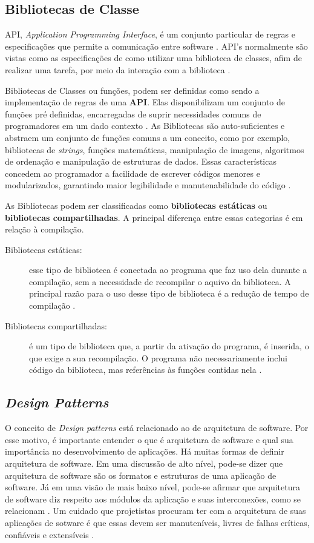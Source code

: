 \subsection{Bibliotecas de Classe}
API, \textit{Application Programming Interface}, é um conjunto particular de
regras e especificações que permite a comunicação entre  software
\cite{simsek2004}. API's normalmente são vistas como as especificações de como
utilizar uma biblioteca de classes, afim de realizar uma tarefa, por meio da
interação com a biblioteca \cite{simsek2004}.
\par
\indent Bibliotecas de Classes ou funções, podem ser definidas como sendo a
implementação de regras de uma \textbf{API}. Elas disponibilizam um conjunto de
funções pré definidas, encarregadas de suprir necessidades comuns de
programadores em um dado contexto \cite{simsek2004}. As Bibliotecas são
auto-suficientes e abstraem um conjunto de funções comuns a um conceito, como
por exemplo, bibliotecas de \textit{strings}, funções matemáticas, manipulação
de imagens, algoritmos de ordenação e manipulação de estruturas de dados. Essas
características concedem ao programador a facilidade de escrever códigos
menores e modularizados, garantindo maior legibilidade e manutenabilidade do
código \cite{simsek2004}.
\par
\indent As Bibliotecas podem ser classificadas como \textbf{bibliotecas estáticas}
ou \textbf{bibliotecas compartilhadas}. A principal diferença entre essas
categorias é em relação à compilação.
\begin{description}
\item[Bibliotecas estáticas:] esse tipo de biblioteca é conectada ao programa
que faz uso dela durante a compilação, sem a necessidade de recompilar o aquivo
da biblioteca. A principal razão para o uso desse tipo de biblioteca é a redução
de tempo de compilação \cite{simsek2004}.
\item[Bibliotecas compartilhadas:] é um tipo de biblioteca que, a partir da
ativação do programa, é inserida, o que exige a sua recompilação. O programa
não necessariamente inclui código da biblioteca, mas referências às funções
contidas nela \cite{simsek2004}.
\end{description}

\subsection{\textit{Design Patterns}}
O conceito de \textit{Design patterns} está relacionado ao de arquitetura de
software. Por esse motivo, é importante entender o que é arquitetura de software
e qual sua importância no desenvolvimento de aplicações. Há muitas formas de
definir arquitetura de software. Em uma discussão de alto nível, pode-se dizer
que arquitetura de software são os formatos e estruturas de uma aplicação de
software. Já em uma visão de mais baixo nível, pode-se afirmar que arquitetura
de software diz respeito aos módulos da aplicação e suas interconexões, como se
relacionam \cite{martin2000}. Um cuidado que projetistas procuram ter com a
arquitetura de suas aplicações de sotware é que essas devem ser manuteníveis,
livres de falhas críticas, confiáveis e extensíveis \cite{kleinWeiss2009}.

